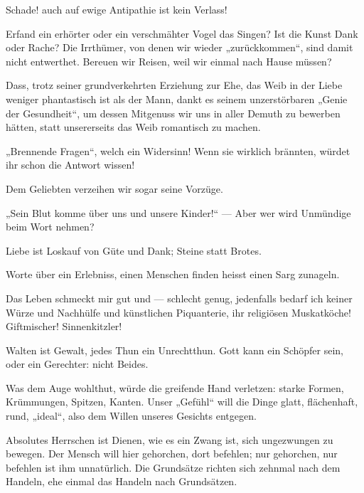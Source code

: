 Schade! auch auf ewige Antipathie ist kein Verlass!
\par

Erfand ein erhörter oder ein verschmähter Vogel das Singen? Ist die Kunst Dank oder Rache? Die Irrthümer, von denen wir wieder „zurückkommen“, sind damit nicht entwerthet. Bereuen wir Reisen, weil wir einmal nach Hause müssen?
\par

Dass, trotz seiner grundverkehrten Erziehung zur Ehe, das Weib in der Liebe weniger phantastisch ist als der Mann, dankt es seinem unzerstörbaren „Genie der Gesundheit“, um dessen Mitgenuss wir uns in aller Demuth zu bewerben hätten, statt unsererseits das Weib romantisch zu machen.
\par

„Brennende Fragen“, welch ein Widersinn! Wenn sie wirklich brännten, würdet ihr schon die Antwort wissen!
\par

Dem Geliebten verzeihen wir sogar seine Vorzüge.
\par

„Sein Blut komme über uns und unsere Kinder!“ — Aber wer wird Unmündige beim Wort nehmen?
\par

Liebe ist Loskauf von Güte und Dank; Steine statt Brotes.
\par

Worte über ein Erlebniss, einen Menschen finden heisst einen Sarg zunageln.
\par

Das Leben schmeckt mir gut und — schlecht genug, jedenfalls bedarf ich keiner Würze und Nachhülfe und künstlichen Piquanterie, ihr religiösen Muskatköche! Giftmischer! Sinnenkitzler!
\par

Walten ist Gewalt, jedes Thun ein Unrechtthun. Gott kann ein Schöpfer sein, oder ein Gerechter: nicht Beides.
\par

Was dem Auge wohlthut, würde die greifende Hand verletzen: starke Formen, Krümmungen, Spitzen, Kanten. Unser „Gefühl“ will die Dinge glatt, flächenhaft, rund, „ideal“, also dem Willen unseres Gesichts entgegen.
\par

Absolutes Herrschen ist Dienen, wie es ein Zwang ist, sich ungezwungen zu bewegen. Der Mensch will hier gehorchen, dort befehlen; nur gehorchen, nur befehlen ist ihm unnatürlich. Die Grundsätze richten sich zehnmal nach dem Handeln, ehe einmal das Handeln nach Grundsätzen.
\par

